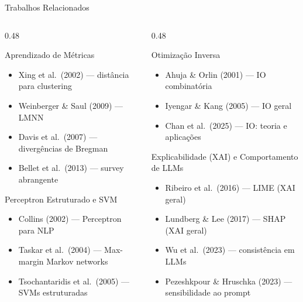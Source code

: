 \documentclass[aspectratio=169, 8pt]{beamer}
\begin{document}
\begin{frame}{Trabalhos Relacionados}
  \begin{columns}[T]
    \begin{column}{0.48\textwidth}
      \begin{block}{Aprendizado de Métricas}
        \begin{itemize}
          \footnotesize
          \item Xing et al.\ (2002) --- distância para clustering
          \item Weinberger \& Saul (2009) --- LMNN
          \item Davis et al.\ (2007) --- divergências de Bregman
          \item Bellet et al.\ (2013) --- survey abrangente
        \end{itemize}
      \end{block}

      \vspace{0.4em}

      \begin{block}{Perceptron Estruturado e SVM}
        \begin{itemize}
          \footnotesize
          \item Collins (2002) --- Perceptron para NLP
          \item Taskar et al.\ (2004) --- Max-margin Markov networks
          \item Tsochantaridis et al.\ (2005) --- SVMs estruturadas
        \end{itemize}
      \end{block}
    \end{column}

    \begin{column}{0.48\textwidth}
      \begin{block}{Otimização Inversa}
        \begin{itemize}
          \footnotesize
          \item Ahuja \& Orlin (2001) --- IO combinatória
          \item Iyengar \& Kang (2005) --- IO geral
          \item Chan et al.\ (2025) --- IO: teoria e aplicações
        \end{itemize}
      \end{block}

      \vspace{0.4em}

      \begin{block}{Explicabilidade (XAI) e Comportamento de LLMs}
        \begin{itemize}
          \footnotesize
          \item Ribeiro et al.\ (2016) --- LIME (XAI geral)
          \item Lundberg \& Lee (2017) --- SHAP (XAI geral)
          \item Wu et al.\ (2023) --- consistência em LLMs
          \item Pezeshkpour \& Hruschka (2023) --- sensibilidade ao prompt
        \end{itemize}
      \end{block}


\end{column}
\end{columns}
\end{frame}
\end{document}
